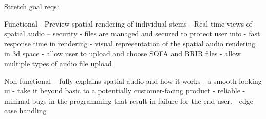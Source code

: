 Stretch goal reqs:

Functional
- Preview spatial rendering of individual stems
- Real-time views of spatial audio
-- security - files are managed and secured to protect user info
- fast response time in rendering
- visual representation of the spatial audio rendering in 3d space
- allow user to upload and choose SOFA and BRIR files
- allow multiple types of audio file upload

Non functional
-- fully explains spatial audio and how it works
- a smooth looking ui - take it beyond basic to a potentially customer-facing product
- reliable - minimal bugs in the programming that result in failure for the end user.
- edge case handling


